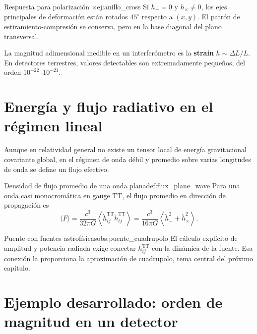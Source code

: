 \begin{ejemplo}{Respuesta para polarización $\times$}{ej:anillo_cross}
Si $h_+=0$ y $h_\times\neq0$, los ejes principales de deformación están rotados $45^\circ$ respecto a $(x,y)$. El patrón de estiramiento-compresión se conserva, pero en la base diagonal del plano transversal.
\end{ejemplo}

\begin{importante}
La magnitud adimensional medible en un interferómetro es la \textbf{strain} $h\sim\Delta L/L$. En detectores terrestres, valores detectables son extremadamente pequeños, del orden $10^{-22}$--$10^{-21}$.
\end{importante}

\section{Energía y flujo radiativo en el régimen lineal}
\label{sec:energia_flujo}

Aunque en relatividad general no existe un tensor local de energía gravitacional covariante global, en el régimen de onda débil y promedio sobre varias longitudes de onda se define un flujo efectivo.

\begin{definicion}{Densidad de flujo promedio de una onda plana}{def:flux_plane_wave}
Para una onda casi monocromática en gauge TT, el flujo promedio en dirección de propagación es
\begin{equation}
  \langle F\rangle=
  \frac{c^3}{32\pi G}
  \left\langle
    \dot h^{\mathrm{TT}}_{ij}\dot h^{\mathrm{TT}}_{ij}
  \right\rangle
  =\frac{c^3}{16\pi G}\left\langle\dot h_+^2+\dot h_\times^2\right\rangle.
\end{equation}
\end{definicion}

\begin{observacion}{Puente con fuentes astrofísicas}{obs:puente_cuadrupolo}
El cálculo explícito de amplitud y potencia radiada exige conectar $h_{ij}^{\mathrm{TT}}$ con la dinámica de la fuente. Esa conexión la proporciona la aproximación de cuadrupolo, tema central del próximo capítulo.
\end{observacion}

\section{Ejemplo desarrollado: orden de magnitud en un detector}
\label{sec:ejemplo_detector}

